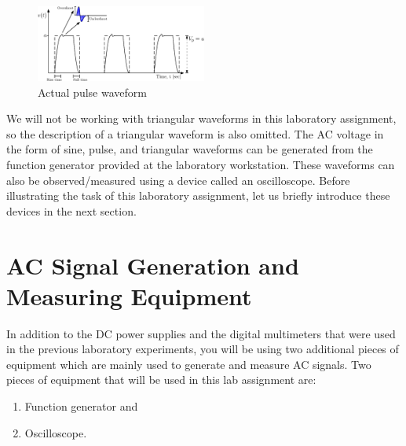 %
    \begin{figure}
    \centering
    \includegraphics[width=0.5\textwidth]{figs/ipe/lab5/figure3b-waveProperties.eps}
    \caption{Actual pulse waveform}
    \label{fig:figure3b-waveProperties}    
    \end{figure}
%
We will not be working with triangular waveforms in this laboratory assignment, so the description of a triangular waveform is also omitted. The AC voltage in the form of sine, pulse, and triangular waveforms can be generated from the function generator provided at the laboratory workstation. These waveforms can also be observed/measured using a device called an oscilloscope. Before illustrating the task of this laboratory assignment, let us briefly introduce these devices in the next section. 


\section{AC Signal Generation and Measuring Equipment}
\label{sec:equipment}

In addition to the DC power supplies and the digital multimeters that were used in the previous laboratory experiments, you will be using two additional pieces of equipment which are mainly used to generate and measure AC signals. Two pieces of equipment that will be used in this lab assignment are:
\begin{enumerate}
    \item Function generator and 
    \item Oscilloscope. 
\end{enumerate}
%


